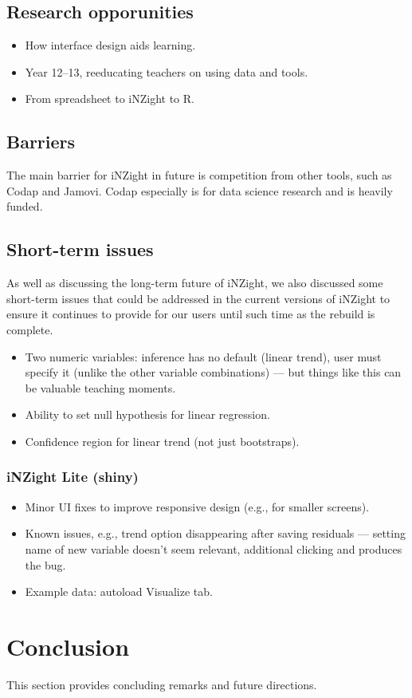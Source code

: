 \documentclass{article}
\begin{document}
\subsection{Research opporunities}

\begin{itemize}
    \item How interface design aids learning.
    \item Year 12--13, reeducating teachers on using data and tools.
    \item From spreadsheet to iNZight to R.
\end{itemize}

\subsection{Barriers}

The main barrier for iNZight in future is competition from other tools, such as Codap and Jamovi.
Codap especially is for data science research and is heavily funded.


\subsection{Short-term issues}

As well as discussing the long-term future of iNZight, we also discussed some short-term issues that could be addressed in the current versions of iNZight to ensure it continues to provide for our users until such time as the rebuild is complete.

\begin{itemize}
    \item Two numeric variables: inference has no default (linear trend), user must specify it (unlike the other variable combinations) --- but things like this can be valuable teaching moments.
    \item Ability to set null hypothesis for linear regression.
    \item Confidence region for linear trend (not just bootstraps).
\end{itemize}

\subsubsection{iNZight Lite (shiny)}

\begin{itemize}
    \item Minor UI fixes to improve responsive design (e.g., for smaller screens).
    \item Known issues, e.g., trend option disappearing after saving residuals --- setting name of new variable doesn't seem relevant, additional clicking and produces the bug.
    \item Example data: autoload Visualize tab.
\end{itemize}


\section{Conclusion}
This section provides concluding remarks and future directions.

\printbibliography
\end{document}
